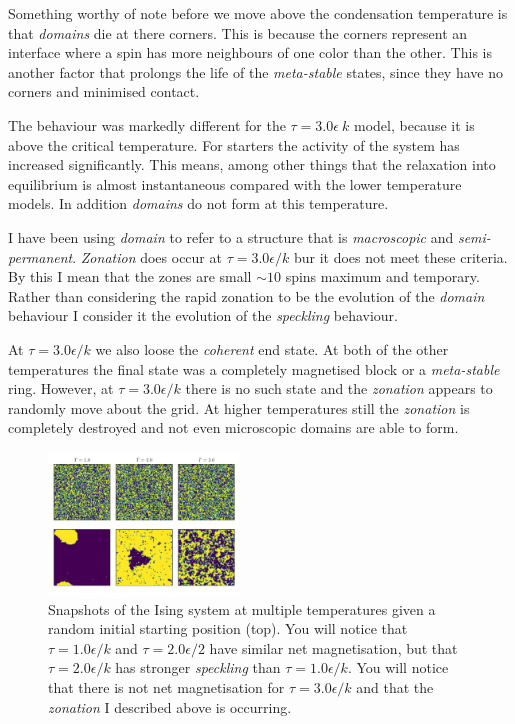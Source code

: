 \documentclass[a4paper, twocolumn]{article}
\begin{document}
Something worthy of note before we move above the condensation %
temperature is that \emph{domains} die at there corners. This %
is because the corners represent an interface where a spin has %
more neighbours of one color than the other. This is another %
factor that prolongs the life of the \emph{meta-stable} states, %
since they have no corners and minimised contact. 


The behaviour was markedly different for the \(\tau = 3.0 \epsilon %
\ k\) model, because it is above the critical temperature. %
For starters the activity of the system has increased significantly. %
This means, among other things that the relaxation into equilibrium %
is almost instantaneous compared with the lower temperature models. %
In addition \emph{domains} do not form at this temperature. 


I have been using \emph{domain} to refer to a structure that is %
\emph{macroscopic} and \emph{semi-permanent}. \emph{Zonation} %
does occur at \(\tau = 3.0 \epsilon / k\) bur it does not meet %
these criteria. By this I mean that the zones are small \(\sim 10\) %
spins maximum and temporary. Rather than considering the rapid %
zonation to be the evolution of the \emph{domain} behaviour I %
consider it the evolution of the \emph{speckling} behaviour.


At \(\tau = 3.0 \epsilon / k\) we also loose the \emph{coherent} %
end state. At both of the other temperatures the final state was %
a completely magnetised block or a \emph{meta-stable} ring. %
However, at \(\tau = 3.0 \epsilon / k\) there is no such state %
and the \emph{zonation} appears to randomly move about the grid. %
At higher temperatures still the \emph{zonation} is completely %
destroyed and not even microscopic domains are able to form. 


\begin{figure}
    \centering
    \includegraphics[width=0.45\textwidth]{pub/figures/first_and_last_ising_2d.pdf}
    \caption{Snapshots of the Ising system at multiple temperatures %
        given a random initial starting position (top). You will %
        notice that \(\tau = 1.0 \epsilon / k\) and \(\tau = 2.0 \epsilon %
        /2\) have similar net magnetisation, but that \(\tau = 2.0 %
        \epsilon / k\) has stronger \emph{speckling} than \(\tau = %
        1.0 \epsilon / k\). You will notice that there is not net %
        magnetisation for \(\tau = 3.0 \epsilon / k\) and that the %
        \emph{zonation} I described above is occurring.}
    \label{fig:5}
\end{figure}
\end{document}
